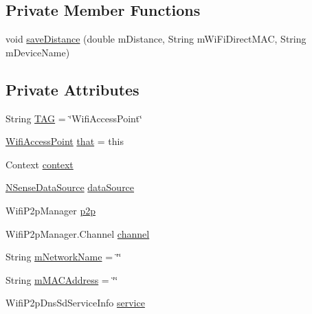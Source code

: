 \subsection*{Private Member Functions}
\begin{DoxyCompactItemize}
\item 
void \hyperlink{classcs_1_1nsense_1_1location_1_1_wifi_access_point_ac72a1b0d16106de37c1a9959fe8cf0c4}{save\-Distance} (double m\-Distance, String m\-Wi\-Fi\-Direct\-M\-A\-C, String m\-Device\-Name)
\end{DoxyCompactItemize}
\subsection*{Private Attributes}
\begin{DoxyCompactItemize}
\item 
String \hyperlink{classcs_1_1nsense_1_1location_1_1_wifi_access_point_affaf896e654a0d447817962205ea2445}{T\-A\-G} = \char`\"{}Wifi\-Access\-Point\char`\"{}
\item 
\hyperlink{classcs_1_1nsense_1_1location_1_1_wifi_access_point}{Wifi\-Access\-Point} \hyperlink{classcs_1_1nsense_1_1location_1_1_wifi_access_point_acd9c4f5de8218e8ba2f0a918bb247dbc}{that} = this
\item 
Context \hyperlink{classcs_1_1nsense_1_1location_1_1_wifi_access_point_a5fd56b2fb85ff6005d6802e158d116ff}{context}
\item 
\hyperlink{classcs_1_1nsense_1_1db_1_1_n_sense_data_source}{N\-Sense\-Data\-Source} \hyperlink{classcs_1_1nsense_1_1location_1_1_wifi_access_point_aea07181cba10c042b1b9b079b557b342}{data\-Source}
\item 
Wifi\-P2p\-Manager \hyperlink{classcs_1_1nsense_1_1location_1_1_wifi_access_point_ae018617cf17ec65327469831a5422ebf}{p2p}
\item 
Wifi\-P2p\-Manager.\-Channel \hyperlink{classcs_1_1nsense_1_1location_1_1_wifi_access_point_a1078104d713e6c15634ce9fd0eb43ec5}{channel}
\item 
String \hyperlink{classcs_1_1nsense_1_1location_1_1_wifi_access_point_a7d81aef9c608578a5089b12737791daa}{m\-Network\-Name} = \char`\"{}\char`\"{}
\item 
String \hyperlink{classcs_1_1nsense_1_1location_1_1_wifi_access_point_ac9e567df7f55043b5d1a60ecc7de4be9}{m\-M\-A\-C\-Address} = \char`\"{}\char`\"{}
\item 
Wifi\-P2p\-Dns\-Sd\-Service\-Info \hyperlink{classcs_1_1nsense_1_1location_1_1_wifi_access_point_a45429f28ad9c4e2c36122e8ace3f3250}{service}

\end{DoxyCompactItemize}
